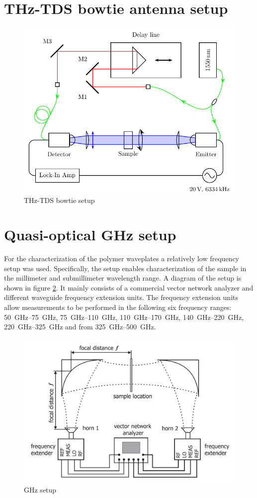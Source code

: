 \section{THz-TDS bowtie antenna setup}
\begin{figure}[H]
    \centering
    \includegraphics{images/3_chapter03/Setup-THz-TDS-Lab1.pdf}
    \caption{THz-TDS bowtie setup}
    \label{fig:THz_bowtie_setup}
\end{figure}

\section{Quasi-optical GHz setup}
For the characterization of the polymer waveplates a relatively low frequency setup was used. Specifically, the setup enables characterization of the sample in the millimeter and submillimeter wavelength range. A diagram of the setup is shown in figure \ref{fig:GHz_setup}. It mainly consists of a commercial vector network analyzer and different waveguide frequency extension units. The frequency extension units allow measurements to be performed in the following six frequency ranges: \SIrange[range-phrase=--]{50}{75}{\giga \hertz}, \SIrange[range-phrase=--]{75}{110}{\giga \hertz}, \SIrange[range-phrase=--]{110}{170}{\giga \hertz}, \SIrange[range-phrase=--]{140}{220}{\giga \hertz}, \SIrange[range-phrase=--]{220}{325}{\giga \hertz} and from \SIrange{325}{500}{\giga \hertz}. 

\begin{figure}[H]
    \centering
    \includegraphics[scale=0.45]{images/3_chapter03/ghz.png}
    \caption{GHz setup}
    \label{fig:GHz_setup}
\end{figure}

